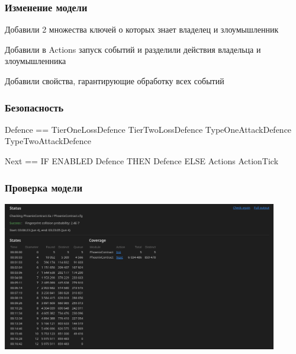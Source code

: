 \documentclass[14pt,aspectratio=169,hyperref={pdftex,unicode},xcolor=dvipsnames]{beamer}
\begin{document}
\begin{frame}[fragile]
\frametitle{Изменение модели}
Добавили 2 множества ключей о которых знает владелец и злоумышленник

Добавили в Actions запуск событий и разделили действия владельца и злоумышленника

Добавили свойства, гарантирующие обработку всех событий 
\end{frame}

\begin{frame}[fragile]
\frametitle{Безопасность}
\small
\begin{code}
Defence ==
    \/ TierOneLossDefence
    \/ TierTwoLossDefence
    \/ TypeOneAttackDefence
    \/ TypeTwoAttackDefence

Next == 
    IF ENABLED Defence
    THEN Defence
    ELSE Actions \/ ActionTick
\end{code}
\end{frame}


\begin{frame}[fragile]
\frametitle{Проверка модели}
\begin{center}
\includegraphics[width=12cm]{images/model_test.png}

\end{center}
\end{frame}
\end{document}
